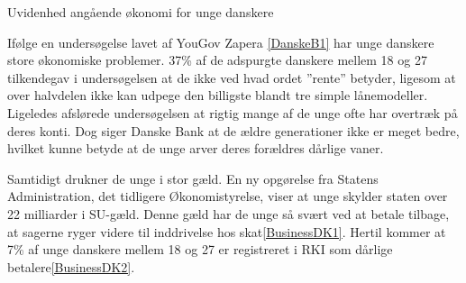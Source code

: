 Uvidenhed angående økonomi for unge danskere

Ifølge en undersøgelse lavet af YouGov Zapera \ref{DanskeB1} har unge danskere store økonomiske problemer. 37\% af de adspurgte danskere mellem 18 og 27 tilkendegav i undersøgelsen at de ikke ved hvad ordet ”rente” betyder, ligesom at over halvdelen ikke kan udpege den billigste blandt tre simple lånemodeller. Ligeledes afslørede undersøgelsen at rigtig mange af de unge ofte har overtræk på deres konti. Dog siger Danske Bank at de ældre generationer ikke er meget bedre, hvilket kunne betyde at de unge arver deres forældres dårlige vaner.  

Samtidigt drukner de unge i stor gæld. En ny opgørelse fra Statens Administration, det tidligere Økonomistyrelse, viser at unge skylder staten over 22 milliarder i SU-gæld. Denne gæld har de unge så svært ved at betale tilbage, at sagerne ryger videre til inddrivelse hos skat\ref{BusinessDK1}. Hertil kommer at 7\% af unge danskere mellem 18 og 27 er registreret i RKI som dårlige betalere\ref{BusinessDK2}.
